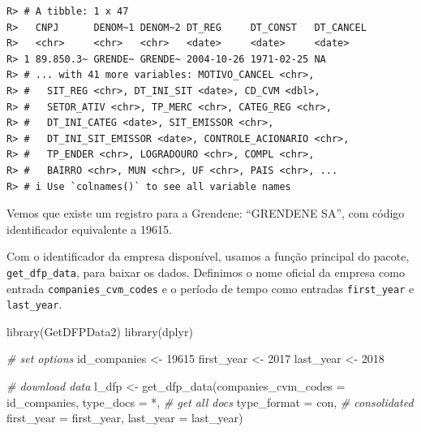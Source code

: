 \documentclass[
  11pt,
]{book}
\newenvironment{Shaded}{\begin{snugshade}}{\end{snugshade}}
\newcommand{\AttributeTok}[1]{\textcolor[rgb]{0.61,0.61,0.61}{#1}}
\newcommand{\CommentTok}[1]{\textcolor[rgb]{0.37,0.37,0.37}{\textit{#1}}}
\newcommand{\DecValTok}[1]{\textcolor[rgb]{0.06,0.06,0.06}{#1}}
\newcommand{\FunctionTok}[1]{\textcolor[rgb]{0,0,0}{#1}}
\newcommand{\NormalTok}[1]{#1}
\newcommand{\OtherTok}[1]{\textcolor[rgb]{0.37,0.37,0.37}{#1}}
\newcommand{\StringTok}[1]{\textcolor[rgb]{0.5,0.5,0.5}{#1}}
\begin{document}
\begin{verbatim}
R> # A tibble: 1 x 47
R>   CNPJ      DENOM~1 DENOM~2 DT_REG     DT_CONST   DT_CANCEL
R>   <chr>     <chr>   <chr>   <date>     <date>     <date>   
R> 1 89.850.3~ GRENDE~ GRENDE~ 2004-10-26 1971-02-25 NA       
R> # ... with 41 more variables: MOTIVO_CANCEL <chr>,
R> #   SIT_REG <chr>, DT_INI_SIT <date>, CD_CVM <dbl>,
R> #   SETOR_ATIV <chr>, TP_MERC <chr>, CATEG_REG <chr>,
R> #   DT_INI_CATEG <date>, SIT_EMISSOR <chr>,
R> #   DT_INI_SIT_EMISSOR <date>, CONTROLE_ACIONARIO <chr>,
R> #   TP_ENDER <chr>, LOGRADOURO <chr>, COMPL <chr>,
R> #   BAIRRO <chr>, MUN <chr>, UF <chr>, PAIS <chr>, ...
R> # i Use `colnames()` to see all variable names
\end{verbatim}

Vemos que existe um registro para a Grendene: ``GRENDENE SA'', com código identificador equivalente a 19615. 

Com o identificador da empresa disponível, usamos a função principal do pacote, \texttt{get\_dfp\_data}, para baixar os dados. Definimos o nome oficial da empresa como entrada \texttt{companies\_cvm\_codes} e o período de tempo como entradas \texttt{first\_year} e \texttt{last\_year}.


\begin{Shaded}
\begin{Highlighting}[]
\FunctionTok{library}\NormalTok{(GetDFPData2)}
\FunctionTok{library}\NormalTok{(dplyr)}

\CommentTok{\# set options}
\NormalTok{id\_companies }\OtherTok{\textless{}{-}} \DecValTok{19615}
\NormalTok{first\_year }\OtherTok{\textless{}{-}} \DecValTok{2017}
\NormalTok{last\_year  }\OtherTok{\textless{}{-}} \DecValTok{2018}

\CommentTok{\# download data}
\NormalTok{l\_dfp }\OtherTok{\textless{}{-}} \FunctionTok{get\_dfp\_data}\NormalTok{(}\AttributeTok{companies\_cvm\_codes =}\NormalTok{ id\_companies,}
                      \AttributeTok{type\_docs =} \StringTok{\textquotesingle{}*\textquotesingle{}}\NormalTok{, }\CommentTok{\# get all docs  }
                      \AttributeTok{type\_format =} \StringTok{\textquotesingle{}con\textquotesingle{}}\NormalTok{, }\CommentTok{\# consolidated}
                      \AttributeTok{first\_year =}\NormalTok{ first\_year,}
                      \AttributeTok{last\_year =}\NormalTok{ last\_year)}
\end{Highlighting}
\end{Shaded}
\end{document}
